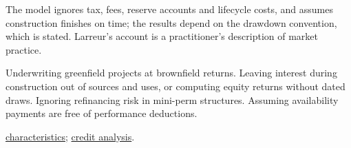 \begin{qfmethod}
 The model ignores tax, fees, reserve accounts and lifecycle costs, and assumes construction finishes on time; the results depend on the drawdown convention, which is stated. Larreur's account is a practitioner's description of market practice.

 Underwriting greenfield projects at brownfield returns. Leaving interest during construction out of sources and uses, or computing equity returns without dated draws. Ignoring refinancing risk in mini-perm structures. Assuming availability payments are free of performance deductions.

 \hyperref[def:infrastructure-characteristics]{characteristics}; \hyperref[meth:private-debt-credit-analysis]{credit analysis}.

\end{qfmethod}

